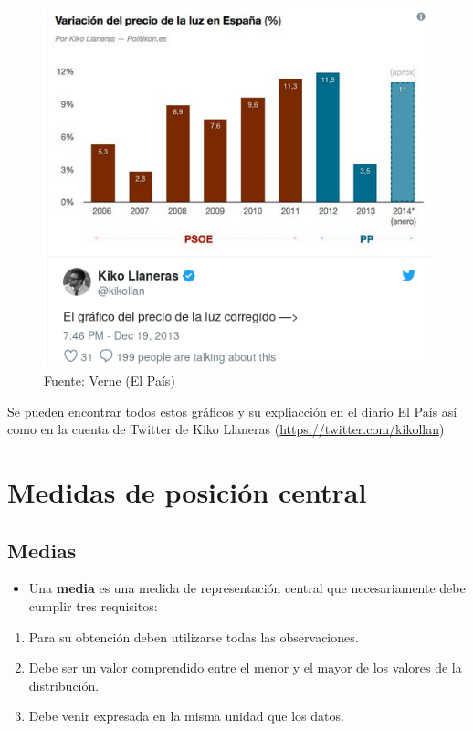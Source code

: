 \documentclass[]{book}
\providecommand{\tightlist}{%
  \setlength{\itemsep}{0pt}\setlength{\parskip}{0pt}}
\theoremstyle{definition}
\theoremstyle{definition}
\theoremstyle{definition}
\theoremstyle{remark}
\begin{document}
\begin{figure}
\centering
\includegraphics{images/grafico_erroneo4bis.png}
\caption{Fuente: Verne (El País)}
\end{figure}

Se pueden encontrar todos estos gráficos y su expliacción en el diario
\href{https://verne.elpais.com/verne/2015/01/23/articulo/1422014607_223837.html}{El
País} así como en la cuenta de Twitter de Kiko Llaneras
\citep{kikollan}(\url{https://twitter.com/kikollan})

\section{Medidas de posición central}\label{medidas-de-posicion-central}

\subsection{Medias}\label{medias}

\begin{itemize}
\tightlist
\item
  Una \textbf{media} es una medida de representación central que
  necesariamente debe cumplir tres requisitos:
\end{itemize}

\begin{enumerate}
\def\labelenumi{\arabic{enumi}.}
\tightlist
\item
  Para su obtención deben utilizarse todas las observaciones.
\item
  Debe ser un valor comprendido entre el menor y el mayor de los valores
  de la distribución.
\item
  Debe venir expresada en la misma unidad que los datos.
\end{enumerate}
\end{document}
